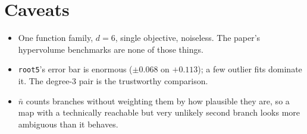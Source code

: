 \documentclass[11pt]{article}
\begin{document}
\section*{Caveats}

\begin{itemize}\itemsep1pt
\item One function family, $d=6$, single objective, noiseless. The paper's
hypervolume benchmarks are none of those things.
\item \texttt{root5}'s error bar is enormous ($\pm0.068$ on $+0.113$); a few
outlier fits dominate it. The degree-3 pair is the trustworthy comparison.
\item $\bar n$ counts branches without weighting them by how plausible they
are, so a map with a technically reachable but very unlikely second branch
looks more ambiguous than it behaves.
\end{itemize}
\end{document}
